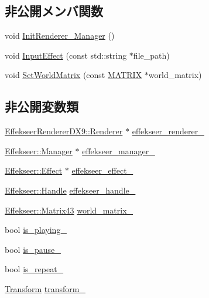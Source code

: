\subsection*{非公開メンバ関数}
\begin{DoxyCompactItemize}
\item 
void \mbox{\hyperlink{class_effekseer_object_a4f8e7ad6b6ebfa341302f6b78e846f1e}{Init\+Renderer\+\_\+\+Manager}} ()
\item 
void \mbox{\hyperlink{class_effekseer_object_a1566339dd4acebff341a867a2fd05c17}{Input\+Effect}} (const std\+::string $\ast$file\+\_\+path)
\item 
void \mbox{\hyperlink{class_effekseer_object_afde70f366e91d31a84ff9b280d4ae3c4}{Set\+World\+Matrix}} (const \mbox{\hyperlink{_vector3_d_8h_a032295cd9fb1b711757c90667278e744}{M\+A\+T\+R\+IX}} $\ast$world\+\_\+matrix)
\end{DoxyCompactItemize}
\subsection*{非公開変数類}
\begin{DoxyCompactItemize}
\item 
\mbox{\hyperlink{class_effekseer_renderer_d_x9_1_1_renderer}{Effekseer\+Renderer\+D\+X9\+::\+Renderer}} $\ast$ \mbox{\hyperlink{class_effekseer_object_a39d29eb6a967f325b3d8659c231e0525}{effekseer\+\_\+renderer\+\_\+}}
\item 
\mbox{\hyperlink{class_effekseer_1_1_manager}{Effekseer\+::\+Manager}} $\ast$ \mbox{\hyperlink{class_effekseer_object_a9f66433b8cecd6753b478a73f93f8179}{effekseer\+\_\+manager\+\_\+}}
\item 
\mbox{\hyperlink{class_effekseer_1_1_effect}{Effekseer\+::\+Effect}} $\ast$ \mbox{\hyperlink{class_effekseer_object_a66c732f526b92301c72070648ca7e70f}{effekseer\+\_\+effect\+\_\+}}
\item 
\mbox{\hyperlink{namespace_effekseer_afba58b8d812da862190e9bbfc040824a}{Effekseer\+::\+Handle}} \mbox{\hyperlink{class_effekseer_object_ac3e771c9f05d91dfe392959591595b7e}{effekseer\+\_\+handle\+\_\+}}
\item 
\mbox{\hyperlink{struct_effekseer_1_1_matrix43}{Effekseer\+::\+Matrix43}} \mbox{\hyperlink{class_effekseer_object_a16171d7157607b9d6a5fc0aa4ad9d454}{world\+\_\+matrix\+\_\+}}
\item 
bool \mbox{\hyperlink{class_effekseer_object_a4ec40aadcda493d25823d95a3035c29d}{is\+\_\+playing\+\_\+}}
\item 
bool \mbox{\hyperlink{class_effekseer_object_ad34fd902c49b1f68dc7b212fe9d2676d}{is\+\_\+pause\+\_\+}}
\item 
bool \mbox{\hyperlink{class_effekseer_object_a4beb29e4b63e4013d1916ccada3c5635}{is\+\_\+repeat\+\_\+}}
\item 
\mbox{\hyperlink{class_transform}{Transform}} \mbox{\hyperlink{class_effekseer_object_a53e096d7eebae5339b2df3c91bc30e7e}{transform\+\_\+}}
\end{DoxyCompactItemize}
